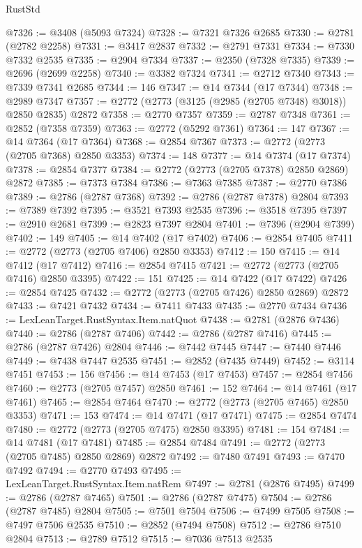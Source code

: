\begin{lexlean}{RustStd}
\begin{coremodule}
@7326 := @3408 (@5093 @7324)
@7328 := @7321 @7326 @2685
@7330 := @2781 (@2782 @2258)
@7331 := @3417 @2837
@7332 := @2791 @7331
@7334 := @7330 @7332 @2535
@7335 := @2904 @7334
@7337 := @2350 (@7328 @7335)
@7339 := @2696 (@2699 @2258)
@7340 := @3382 @7324
@7341 := @2712 @7340
@7343 := @7339 @7341 @2685
@7344 := 146
@7347 := @14 @7344 (@17 @7344)
@7348 := @2989 @7347
@7357 := @2772 (@2773 (@3125 (@2985 (@2705 @7348) @3018)) @2850 @2835) @2872
@7358 := @2770 @7357
@7359 := @2787 @7348
@7361 := @2852 (@7358 @7359)
@7363 := @2772 (@5292 @7361)
@7364 := 147
@7367 := @14 @7364 (@17 @7364)
@7368 := @2854 @7367
@7373 := @2772 (@2773 (@2705 @7368) @2850 @3353)
@7374 := 148
@7377 := @14 @7374 (@17 @7374)
@7378 := @2854 @7377
@7384 := @2772 (@2773 (@2705 @7378) @2850 @2869) @2872
@7385 := @7373 @7384
@7386 := @7363 @7385
@7387 := @2770 @7386
@7389 := @2786 (@2787 @7368)
@7392 := @2786 (@2787 @7378) @2804
@7393 := @7389 @7392
@7395 := @3521 @7393 @2535
@7396 := @3518 @7395
@7397 := @2910 @2681
@7399 := @2823 @7397 @2804
@7401 := @7396 (@2904 @7399)
@7402 := 149
@7405 := @14 @7402 (@17 @7402)
@7406 := @2854 @7405
@7411 := @2772 (@2773 (@2705 @7406) @2850 @3353)
@7412 := 150
@7415 := @14 @7412 (@17 @7412)
@7416 := @2854 @7415
@7421 := @2772 (@2773 (@2705 @7416) @2850 @3395)
@7422 := 151
@7425 := @14 @7422 (@17 @7422)
@7426 := @2854 @7425
@7432 := @2772 (@2773 (@2705 @7426) @2850 @2869) @2872
@7433 := @7421 @7432
@7434 := @7411 @7433
@7435 := @2770 @7434
@7436 := LexLeanTarget.RustSyntax.Item.natQuot
@7438 := @2781 (@2876 @7436)
@7440 := @2786 (@2787 @7406)
@7442 := @2786 (@2787 @7416)
@7445 := @2786 (@2787 @7426) @2804
@7446 := @7442 @7445
@7447 := @7440 @7446
@7449 := @7438 @7447 @2535
@7451 := @2852 (@7435 @7449)
@7452 := @3114 @7451
@7453 := 156
@7456 := @14 @7453 (@17 @7453)
@7457 := @2854 @7456
@7460 := @2773 (@2705 @7457) @2850
@7461 := 152
@7464 := @14 @7461 (@17 @7461)
@7465 := @2854 @7464
@7470 := @2772 (@2773 (@2705 @7465) @2850 @3353)
@7471 := 153
@7474 := @14 @7471 (@17 @7471)
@7475 := @2854 @7474
@7480 := @2772 (@2773 (@2705 @7475) @2850 @3395)
@7481 := 154
@7484 := @14 @7481 (@17 @7481)
@7485 := @2854 @7484
@7491 := @2772 (@2773 (@2705 @7485) @2850 @2869) @2872
@7492 := @7480 @7491
@7493 := @7470 @7492
@7494 := @2770 @7493
@7495 := LexLeanTarget.RustSyntax.Item.natRem
@7497 := @2781 (@2876 @7495)
@7499 := @2786 (@2787 @7465)
@7501 := @2786 (@2787 @7475)
@7504 := @2786 (@2787 @7485) @2804
@7505 := @7501 @7504
@7506 := @7499 @7505
@7508 := @7497 @7506 @2535
@7510 := @2852 (@7494 @7508)
@7512 := @2786 @7510 @2804
@7513 := @2789 @7512
@7515 := @7036 @7513 @2535

\end{coremodule}
\end{lexlean}
